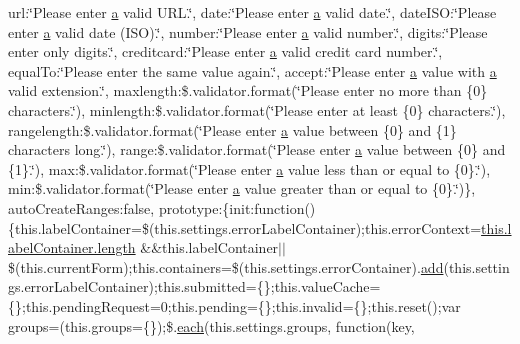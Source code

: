 \begin{DoxyCompactItemize}
url\+:\char`\"{}Please enter \hyperlink{packages_2bootstrap_83_80_80_2content_2_scripts_2bootstrap_8min_8js_a7318f59fb86a4437995ee89c780c51ac}{a} valid U\+R\+L.\char`\"{}, date\+:\char`\"{}Please enter \hyperlink{packages_2bootstrap_83_80_80_2content_2_scripts_2bootstrap_8min_8js_a7318f59fb86a4437995ee89c780c51ac}{a} valid date.\char`\"{}, date\+I\+S\+O\+:\char`\"{}Please enter \hyperlink{packages_2bootstrap_83_80_80_2content_2_scripts_2bootstrap_8min_8js_a7318f59fb86a4437995ee89c780c51ac}{a} valid date (I\+S\+O).\char`\"{}, number\+:\char`\"{}Please enter \hyperlink{packages_2bootstrap_83_80_80_2content_2_scripts_2bootstrap_8min_8js_a7318f59fb86a4437995ee89c780c51ac}{a} valid number.\char`\"{}, digits\+:\char`\"{}Please enter only digits.\char`\"{}, creditcard\+:\char`\"{}Please enter \hyperlink{packages_2bootstrap_83_80_80_2content_2_scripts_2bootstrap_8min_8js_a7318f59fb86a4437995ee89c780c51ac}{a} valid credit card number.\char`\"{}, equal\+To\+:\char`\"{}Please enter the same value again.\char`\"{}, accept\+:\char`\"{}Please enter \hyperlink{packages_2bootstrap_83_80_80_2content_2_scripts_2bootstrap_8min_8js_a7318f59fb86a4437995ee89c780c51ac}{a} value with \hyperlink{packages_2bootstrap_83_80_80_2content_2_scripts_2bootstrap_8min_8js_a7318f59fb86a4437995ee89c780c51ac}{a} valid extension.\char`\"{}, maxlength\+:\$.\+validator.\+format(\char`\"{}Please enter no more than \{0\} characters.\char`\"{}), minlength\+:\$.\+validator.\+format(\char`\"{}Please enter at least \{0\} characters.\char`\"{}), rangelength\+:\$.\+validator.\+format(\char`\"{}Please enter \hyperlink{packages_2bootstrap_83_80_80_2content_2_scripts_2bootstrap_8min_8js_a7318f59fb86a4437995ee89c780c51ac}{a} value between \{0\} and \{1\} characters long.\char`\"{}), range\+:\$.\+validator.\+format(\char`\"{}Please enter \hyperlink{packages_2bootstrap_83_80_80_2content_2_scripts_2bootstrap_8min_8js_a7318f59fb86a4437995ee89c780c51ac}{a} value between \{0\} and \{1\}.\char`\"{}), max\+:\$.\+validator.\+format(\char`\"{}Please enter \hyperlink{packages_2bootstrap_83_80_80_2content_2_scripts_2bootstrap_8min_8js_a7318f59fb86a4437995ee89c780c51ac}{a} value less than or equal to \{0\}.\char`\"{}), min\+:\$.\+validator.\+format(\char`\"{}Please enter \hyperlink{packages_2bootstrap_83_80_80_2content_2_scripts_2bootstrap_8min_8js_a7318f59fb86a4437995ee89c780c51ac}{a} value greater than or equal to \{0\}.\char`\"{})\}, auto\+Create\+Ranges\+:false, prototype\+:\{init\+:function()\{this.\+label\+Container=\$(this.\+settings.\+error\+Label\+Container);this.\+error\+Context=\hyperlink{jquery-1_810_82-vsdoc_8js_aa7de35d58da66d9944ab9cbe82c19640}{this.\+label\+Container.\+length} \&\&this.\+label\+Container$\vert$$\vert$\$(this.\+current\+Form);this.\+containers=\$(this.\+settings.\+error\+Container).\hyperlink{jquery-1_810_82-vsdoc_8js_a2f34e089948aad779d5a43c9b381caa6}{add}(this.\+settings.\+error\+Label\+Container);this.\+submitted=\{\};this.\+value\+Cache=\{\};this.\+pending\+Request=0;this.\+pending=\{\};this.\+invalid=\{\};this.\+reset();var groups=(this.\+groups=\{\});\$.\hyperlink{packages_2j_query_81_810_82_2_content_2_scripts_2jquery-1_810_82_8min_8js_af24c9ea1e34372f8c8b312b35586008d}{each}(this.\+settings.\+groups, function(key, 
\end{DoxyCompactItemize}
